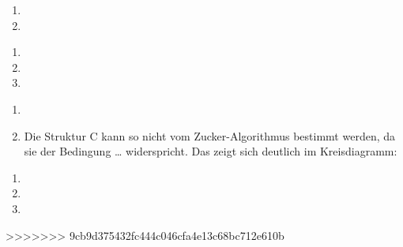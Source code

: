 \documentclass{homework}
\begin{document}
\begin{enumerate}
\begin{enumerate}
\item
\item
\end{enumerate}

\begin{enumerate}
\item
\item
\item
\end{enumerate}

\begin{enumerate}
\item
\item
Die Struktur C kann so nicht vom Zucker-Algorithmus bestimmt werden,
da sie der Bedingung \ldots %
widerspricht. Das zeigt sich deutlich im Kreisdiagramm:

\end{enumerate}

\begin{enumerate}
\item
\item
\item
\end{enumerate}

>>>>>>> 9cb9d375432fc444c046cfa4e13c68bc712e610b
\end{enumerate}
\end{document}
